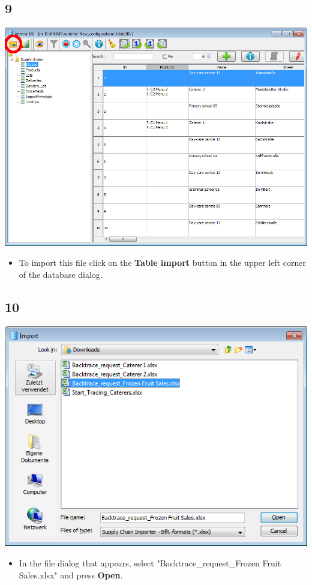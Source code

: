 \documentclass{beamer}
\begin{document}
\subsection{9}
\begin{frame}
	\begin{center}
  		\includegraphics[height=0.6\textheight]{9.png}
	\end{center}
	\begin{itemize}
		\item To import this file click on the \textbf{Table import} button in the upper left corner of the database dialog.
	\end{itemize}
\end{frame}

\subsection{10}
\begin{frame}
	\begin{center}
  		\includegraphics[height=0.5\textheight]{10.png}
	\end{center}
	\begin{itemize}
		\item In the file dialog that appears, select "Backtrace\_request\_Frozen Fruit Sales.xlsx" and press \textbf{Open}.
	\end{itemize}
\end{frame}
\end{document}

